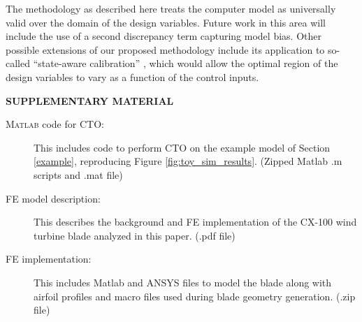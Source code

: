 \documentclass[12pt]{article}
\begin{document}
%
The methodology as described here treats the computer model as universally valid over the domain of the design variables. 
%
Future work in this area will include the use of a second discrepancy term capturing model bias.
%
%
Other possible extensions of our proposed methodology include its application to so-called ``state-aware calibration'' \citep{Atamturktur2015,Stevens2018,Brown2016}, which would allow the optimal region of the design variables to vary as a function of the control inputs.



\bigskip
\begin{center}
{\large\bf SUPPLEMENTARY MATERIAL}
\end{center}

\begin{description}


\item[{\scshape Matlab} code for CTO:] This includes code to perform CTO on the example model of Section \ref{example}, reproducing Figure \ref{fig:toy_sim_results}. (Zipped {Matlab} .m scripts and .mat file)
\item[FE model description:] This describes the background and FE implementation of the CX-100 wind turbine blade analyzed in this paper. (.pdf file)
\item[FE implementation:] This includes Matlab and ANSYS files to model the blade along with airfoil profiles and macro files used during blade geometry generation. (.zip file)


%

\end{description}




\end{document}
